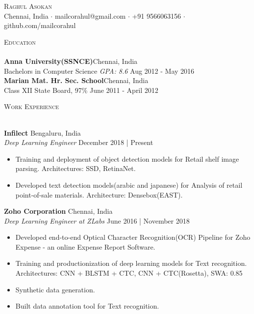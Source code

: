 \documentclass[a4paper]{article}
\newcommand{\lineunder} {
    \vspace*{-8pt} \\
    \hspace*{-18pt} \hrulefill \\
}
\newcommand{\header} [1] {
    {\hspace*{-18pt}\vspace*{6pt} \textsc{#1}}
    \vspace*{-6pt} \lineunder
}
\begin{document}
\vspace*{-40pt}

    

\vspace*{-10pt}
\begin{center}
	{\Huge \scshape {Raghul Asokan}}\\
	Chennai, India $\cdot$ mailcorahul@gmail.com $\cdot$ +91 9566063156 $\cdot$ github.com/mailcorahul\\
\end{center}

\header{Education}
\textbf{Anna University(SSNCE)}\hfill Chennai, India\\
Bachelor\textquotesingle{}s in Computer Science \textit{GPA: 8.6} \hfill Aug 2012 - May 2016\\
\vspace{2mm}
\textbf{Marian Mat. Hr. Sec. School}\hfill Chennai, India\\
Class XII State Board, 97\% \hfill June 2011 - April 2012\\
\vspace{2mm}

\header{Work Experience}
\vspace{1mm}

\textbf{Infilect} \hfill Bengaluru, India\\
\textit{Deep Learning Engineer} \hfill December 2018 | Present\\

\begin{itemize}
    \itemsep-0.5em
    \item Training and deployment of object detection models for Retail shelf image parsing. Architectures: SSD, RetinaNet.
    \item Developed text detection models(arabic and japanese) for Analysis of retail point-of-sale materials. Architecture: Densebox(EAST).
\end{itemize}
\vspace*{1mm}

\textbf{Zoho Corporation} \hfill Chennai, India\\
\textit{Deep Learning Engineer at ZLabs} \hfill June 2016 | November 2018\\

\begin{itemize}
    \itemsep-0.5em
    \item Developed end-to-end Optical Character Recognition(OCR) Pipeline for Zoho Expense - an online Expense Report Software.
    \item Training and productionization of deep learning models for Text recognition. Architectures: CNN + BLSTM + CTC, CNN + CTC(Rosetta), SWA: 0.85
    \item Synthetic data generation.
    \item Built data annotation tool for Text recognition.
\end{itemize}
\end{document}

